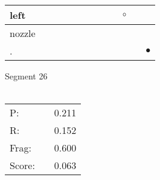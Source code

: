 \documentclass[landscape]{article}
\newcommand{\ssp}{\hspace{2pt}}
\newcommand{\mex}{\cellcolor{g}$\bullet$}
\newcommand{\map}{\cellcolor{y}$\boldsymbol\circ$}
\begin{document}
\begin{tabular}{|l|p{10pt}|p{10pt}|p{10pt}|p{10pt}|p{10pt}|p{10pt}|p{10pt}|p{10pt}|p{10pt}|p{10pt}|p{10pt}|}
\hline
\ssp \cellcolor{ref8}left \ssp&\hspace{2pt}&\hspace{2pt}&\hspace{2pt}&\hspace{2pt}&\hspace{2pt}&\hspace{2pt}&\hspace{2pt}&\hspace{2pt}&\hspace{2pt}\map&\hspace{2pt}&\hspace{2pt}\\
\hline
\ssp nozzle \ssp&\hspace{2pt}&\hspace{2pt}&\hspace{2pt}&\hspace{2pt}&\hspace{2pt}&\hspace{2pt}&\hspace{2pt}&\hspace{2pt}&\hspace{2pt}&\hspace{2pt}&\hspace{2pt}\\
\hline
\ssp \cellcolor{ref10}. \ssp&\hspace{2pt}&\hspace{2pt}&\hspace{2pt}&\hspace{2pt}&\hspace{2pt}&\hspace{2pt}&\hspace{2pt}&\hspace{2pt}&\hspace{2pt}&\hspace{2pt}&\hspace{2pt}\mex\\
\hline
\end{tabular}

\vspace{6pt}
\noindent Segment 26\\\\
\noindent\begin{tabular}{lm{12pt}r}
\hline
P:&&0.211\\
R:&&0.152\\
Frag:&&0.600\\
Score:&&0.063\\
\end{tabular}
\end{document}
